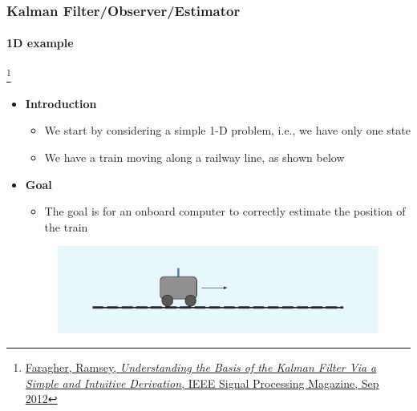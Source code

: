 \begin{frame}[plain]
\frametitle{Kalman Filter/Observer/Estimator}
\framesubtitle{1D example}

\footnote{\tiny\hspace{-0.23in} \href{http://www.cl.cam.ac.uk/~rmf25/papers/Understanding the Basis of the Kalman Filter.pdf}{Faragher, Ramsey, \emph{Understanding the Basis of the Kalman Filter Via a Simple and Intuitive Derivation}, IEEE Signal Processing Magazine, Sep 2012}}
\scriptsize
\begin{changemargin}{-1.3in}{0in}
\begin{itemize}\scriptsize
\item \textbf{Introduction}
\begin{itemize}\scriptsize
\item We start by considering a simple 1-D problem, i.e., we have only one state
\item We have a train moving along a railway line, as shown below
\end{itemize}
\item \textbf{Goal}
\begin{itemize}\scriptsize
\item The goal is for an onboard computer to correctly estimate the position of the train
\end{itemize}
\begin{figure}[h]
\centering
\includegraphics[width=1.35\textwidth]{figs/2012_MAG_Understanding_the_Basis_of_the_Kalman_Filter_fig0.pdf}
\end{figure}
\end{itemize}
\end{changemargin}
\end{frame}




